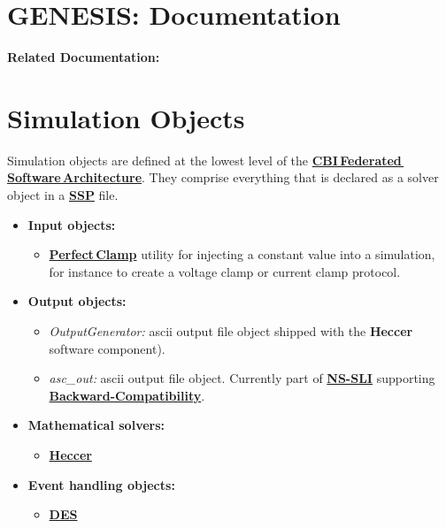 \documentclass[12pt]{article}
\begin{document}
\section*{GENESIS: Documentation}

{\bf Related Documentation:}

\section*{Simulation Objects}

Simulation objects are defined at the lowest level of the
\href{../genesis-overview/genesis-overview.tex}{\bf
  CBI\,Federated\,Software\,Architecture}.  They comprise everything
that is declared as a solver object in a \href{../ssp/ssp.tex}{\bf
  SSP} file.

\begin{itemize}

\item {\bf Input objects:}
   \begin{itemize}
   \item \href{../pclamp/pclamp.tex}{\bf Perfect\,Clamp} utility for
     injecting a constant value into a simulation, for instance to
     create a voltage clamp or current clamp protocol.
   \end{itemize}
   
\item {\bf Output objects:}
   \begin{itemize}
   \item {\it OutputGenerator:} ascii output file object shipped with
     the {\bf Heccer} software component).
   \item {\it asc\_out:} ascii output file object.  Currently part of
     \href{../ns-sli/ns-sli.tex}{\bf NS-SLI} supporting
     \href{../backward-compatibility/backward-compatibility.tex}{\bf
       Backward-Compatibility}.
   \end{itemize}

\item{\bf Mathematical solvers:}
   \begin{itemize}
      \item \href{../heccer/heccer.tex}{\bf Heccer}
   \end{itemize}
   
\item{\bf Event handling objects:}
   \begin{itemize}
      \item \href{../des/des.tex}{\bf DES}
   \end{itemize}
   
\end{itemize}
\end{document}

